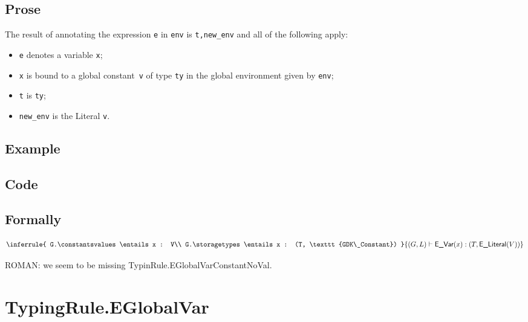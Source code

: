 \documentclass{book}
\newcommand\eliteral[1]{\textsf{E\_Literal}(#1)}
\begin{document}
  \subsection{Prose}
  The result of annotating the expression \texttt{e} in \texttt{env} is
\texttt{t,new\_env} and all of the following apply:
  \begin{itemize}
  \item \texttt{e} denotes a variable \texttt{x};
  \item \texttt{x} is bound to a global constant~\texttt{v} of type \texttt{ty} in the global environment given by \texttt{env};
  \item \texttt{t} is \texttt{ty};
  \item \texttt{new\_env} is the Literal \texttt{v}.
  \end{itemize}

  \subsection{Example}

  \subsection{Code}

\begin{emptyformal}
  \subsection{Formally}
\[
\inferrule{
  G.\constantsvalues \entails x : V\\
  G.\storagetypes \entails x : (T, \texttt{GDK\_Constant})
  }
{(G,L) \entails \evar(x) : (T, \eliteral{V})}
\]
\end{emptyformal}


\begin{emptytodo}
ROMAN: we seem to be missing TypinRule.EGlobalVarConstantNoVal.
\end{emptytodo}

\section{TypingRule.EGlobalVar \label{sec:TypingRule.EGlobalVar}}
\end{document}

